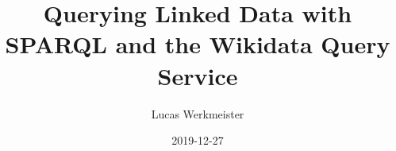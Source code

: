 \documentclass[aspectratio=169]{beamer}
\title{Querying Linked Data with SPARQL and the Wikidata Query Service}
\author{Lucas Werkmeister}
\date{2019-12-27}
\begin{document}
\frame{\titlepage}
\end{document}
